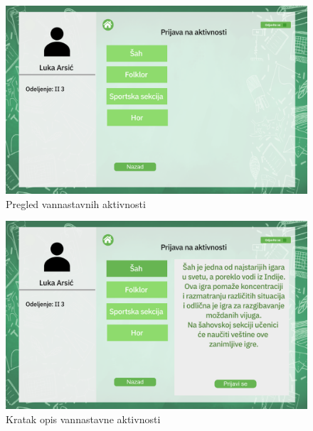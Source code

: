 \documentclass{article}
\begin{document}
\begin{figure} [!ht]
    \begin{center}
        \includegraphics[scale=0.22]{../UI/Ucenik/Student_form_activity.png}
    \end{center}
\caption{Pregled vannastavnih aktivnosti}
\end{figure}

\begin{figure} [!ht]
    \begin{center}
        \includegraphics[scale=0.22]{../UI/Ucenik/Student_form_activity chess.png}
    \end{center}
\caption{Kratak opis vannastavne aktivnosti}
\end{figure}
\end{document}
